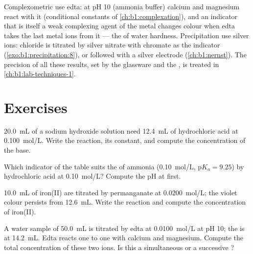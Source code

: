 Complexometric  use edta: at pH 10 (ammonia buffer) calcium
and magnesium react with it  (conditional constants of
\cref{ch:b1:complexation}), and an indicator that is itself a weak
complexing agent of the metal changes colour when edta takes the last
metal ions from it --- the  of water hardness. Precipitation
 use silver ions: chloride is titrated by silver nitrate with
chromate as the indicator (\cref{exo:b1:precipitation:8}), or followed
with a silver electrode (\cref{ch:b1:nernst}). The precision of all these
results, set by the glassware and the , is treated in
\cref{ch:b1:lab-techniques-1}.

\section{Exercises}

\begin{exercise}[$\star$]\label{exo:b1:titration-methods:1}
\qty{20.0}{mL} of a sodium hydroxide solution need \qty{12.4}{mL} of
hydrochloric acid at \qty{0.100}{mol/L}. Write the reaction, its constant,
and compute the concentration of the base.
\end{exercise}

\begin{exercise}[$\star$]\label{exo:b1:titration-methods:2}
Which indicator of the table suits the  of ammonia (\qty{0.10}{mol/L},
$\mathrm{p}K_a = 9.25$) by hydrochloric acid at \qty{0.10}{mol/L}? Compute
the pH at  first.
\end{exercise}

\begin{exercise}[$\star$]\label{exo:b1:titration-methods:3}
\qty{10.0}{mL} of iron(II) are titrated by permanganate at
\qty{0.0200}{mol/L}; the violet colour persists from \qty{12.6}{mL}.
Write the reaction and compute the concentration of iron(II).
\end{exercise}

\begin{exercise}[$\star$]\label{exo:b1:titration-methods:4}
A water sample of \qty{50.0}{mL} is titrated by edta at
\qty{0.0100}{mol/L} at pH 10; the  is at \qty{14.2}{mL}. Edta
reacts one to one with calcium and magnesium. Compute the total
concentration of these two ions. Is this a simultaneous or a successive
?
\end{exercise}

